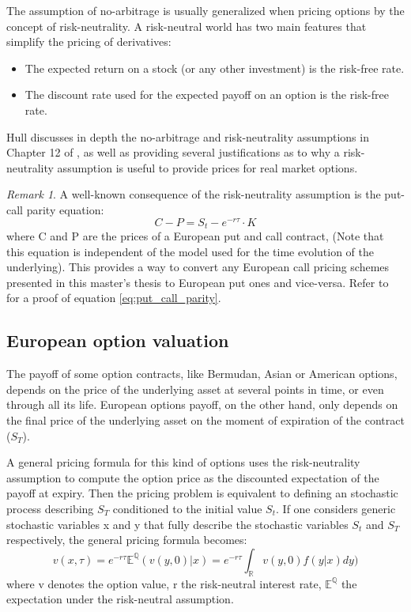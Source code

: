 \documentclass[12,twoside]{mammeTFM}
\theoremstyle{definition}
\theoremstyle{remark}
\newtheorem{remark}[thm]{Remark}
\newcommand{\E}{\ensuremath{\mathbb{E}}}
\newcommand{\Q}{\ensuremath{\mathbb{Q}}}
\newcommand{\R}{\ensuremath{\mathbb{R}}}
\begin{document}
The assumption of no-arbitrage is usually generalized when pricing options by the concept of risk-neutrality. A risk-neutral world has two main features that simplify the pricing of derivatives:
\begin{itemize}
\item The expected return on a stock (or any other investment) is the risk-free rate.
\item The discount rate used for the expected payoff on an option is the risk-free rate.
\end{itemize}

Hull discusses in depth the no-arbitrage and risk-neutrality assumptions in Chapter 12 of \cite{hul09}, as well as providing several justifications as to why a risk-neutrality assumption is useful to provide prices for real market options.

\begin{remark}
A well-known consequence of the risk-neutrality assumption is the put-call parity equation:
\begin{equation}\label{eq:put_call_parity}
C - P = S_t - e^{-r\tau} \cdot K
\end{equation}
where C and P are the prices of a European put and call contract, (Note that this equation is independent of the model used for the time evolution of the underlying). This provides a way to convert any European call pricing schemes presented in this master's thesis to European put ones and vice-versa. Refer to \cite{hul09} for a proof of equation \ref{eq:put_call_parity}.
\end{remark}

\subsection{European option valuation} \label{subsec:european_option_valuation}
The payoff of some option contracts, like Bermudan, Asian or American options, depends on the price of the underlying asset at several points in time, or even through all its life. European options payoff, on the other hand, only depends on the final price of the underlying asset on the moment of expiration of the contract ($S_T$). 

A general pricing formula for this kind of options uses the risk-neutrality assumption to compute the option price as the discounted expectation of the payoff at expiry. Then the pricing problem is equivalent to defining an stochastic process describing $S_T$ conditioned to the initial value $S_t$. If one considers generic stochastic variables x and y that fully describe the stochastic variables $S_t$ and $S_T$ respectively, the general pricing formula becomes:
\begin{equation}
\label{eq:integral_option_valuation}
v(x, \tau)  = e^{-r \tau}\E^{\Q}(v(y, 0)|x)  = e^{-r\tau} \int_{\R}v(y,0)f(y|x)dy)
\end{equation}
where v denotes the option value, r the risk-neutral interest rate, $\E^{\Q}$ the expectation under the risk-neutral assumption.
\end{document}
